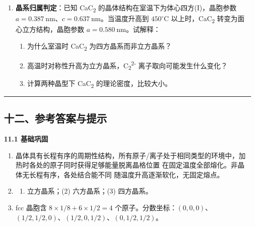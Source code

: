 \begin{enumerate}
  \begin{enumerate}
  \def\labelenumii{(\arabic{enumii})}
  \tightlist
  \item
    计算每个晶胞中的钨原子数。
  \item
    计算阿伏加德罗常数 \(N_A\)。
  \item
    计算空间利用率(堆积效率)。
  \end{enumerate}
\item
  \textbf{晶系归属判定}：已知 CaC\textsubscript{2} 的晶体结构在室温下为体心四方(I)，晶胞参数 \(a = 0.387\ \mathrm{nm}\)、\(c = 0.637\ \mathrm{nm}\)。当温度升高到 \(450^\circ\mathrm{C}\) 以上时，CaC\textsubscript{2} 转变为面心立方结构，晶胞参数 \(a = 0.580\ \mathrm{nm}\)。试解释：

  \begin{enumerate}
  \def\labelenumii{(\arabic{enumii})}
  \tightlist
  \item
    为什么室温时 CaC\textsubscript{2} 为四方晶系而非立方晶系？
  \item
    高温时对称性升高为立方晶系，C\textsubscript{2}\textsuperscript{2-} 离子取向可能发生什么变化？
  \item
    计算两种晶型下 CaC\textsubscript{2} 的理论密度，比较大小。
  \end{enumerate}
\end{enumerate}

\begin{center}\rule{0.5\linewidth}{0.5pt}\end{center}

\subsection{十二、参考答案与提示}\label{ux5341ux4e8cux53c2ux8003ux7b54ux6848ux4e0eux63d0ux793a}

\textbf{11.1 基础巩固}

\begin{enumerate}
\def\labelenumi{\arabic{enumi}.}
\item
  晶体具有长程有序的周期性结构，所有原子/离子处于相同类型的环境中，加热时各处的原子同时获得足够能量脱离晶格位置 \箭 在固定温度全部熔化。非晶体无长程有序，各处结合能不同 \箭 随温度升高逐渐软化，无固定熔点。
\item
  \begin{enumerate}
  \def\labelenumii{(\arabic{enumii})}
  \tightlist
  \item
    立方晶系；(2) 六方晶系；(3) 四方晶系。
  \end{enumerate}
\item
  fcc 晶胞含 \(8 \times 1/8 + 6 \times 1/2 = 4\) 个原子。分数坐标：\((0, 0, 0)\)、\((1/2, 1/2, 0)\)、\((1/2, 0, 1/2)\)、\((0, 1/2, 1/2)\)。
\end{enumerate}

